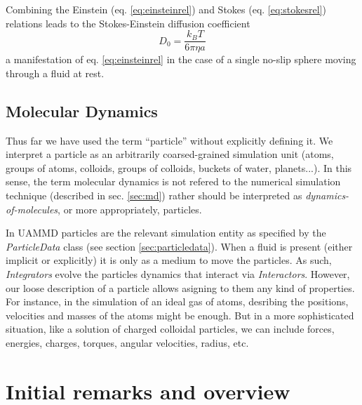 \documentclass[ twoside,openright,titlepage,numbers=noenddot,%
headinclude,footinclude,cleardoublepage=empty,abstract=on,
BCOR=5mm,paper=a4,fontsize=11pt, dvipsnames
]{scrreprt}
\newcommand{\uammd}{\gls{UAMMD}\xspace}
\newcommand{\kT}{k_B T}
\begin{document}
Combining the Einstein (eq. \eqref{eq:einsteinrel}) and Stokes (eq. \eqref{eq:stokesrel}) relations leads to the Stokes-Einstein diffusion coefficient
\begin{equation}
  \label{eq:spherediff}
  D_0 = \frac{\kT}{6\pi\eta a}
\end{equation}
a manifestation of eq. \eqref{eq:einsteinrel} in the case of a single no-slip sphere moving through a fluid at rest.


\section{\uppercase{{\bfseries M}}olecular \uppercase{\textbf{D}}ynamics}\label{sec:dynmol}
Thus far we have used the term ``particle'' without explicitly defining it. We interpret a particle as an arbitrarily coarsed-grained simulation unit (atoms, groups of atoms, colloids, groups of colloids, buckets of water, planets...). In this sense, the term molecular dynamics is not refered to the numerical simulation technique (described in sec. \ref{sec:md}) rather should be interpreted as \emph{dynamics-of-molecules}, or more appropriately, particles.

In \uammd particles are the relevant simulation entity as specified by the \emph{ParticleData} class (see section \ref{sec:particledata}). When a fluid is present (either implicit or explicitly) it is only as a medium to move the particles. As such, \emph{Integrators} evolve the particles dynamics that interact via \emph{Interactors}. However, our loose description of a particle allows asigning to them any kind of properties. For instance, in the simulation of an ideal gas of atoms, desribing the positions, velocities and masses of the atoms might be enough. But in a more sophisticated situation, like a solution of charged colloidal particles, we can include forces, energies, charges, torques, angular velocities, radius, etc.



\chapter{Initial remarks and overview}

\end{document}
